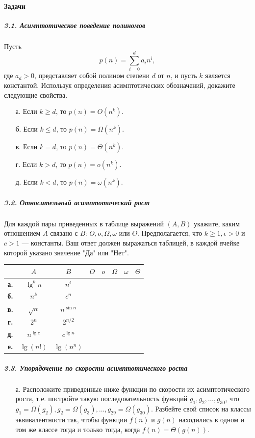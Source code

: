 \paragraph{Задачи}
\subparagraph{3.1. Асимптотическое поведение полиномов}
Пусть 
\[ p(n) = \sum_{i=0}^{d} a_i n^i, \]
где $a_d > 0$, представляет собой полином степени $d$ от $n$, и пусть $k$ является константой. Используя определения асимптотических обозначений, докажите следующие свойства.

\begin{itemize}
    \item[а.] Если $k \ge d$, то $p(n) = O(n^k)$.
    \item[б.] Если $k \le d$, то $p(n) = \Omega(n^k)$.
    \item[в.] Если $k = d$, то $p(n) = \Theta(n^k)$.
    \item[г.] Если $k > d$, то $p(n) = o(n^k)$.
    \item[д.] Если $k < d$, то $p(n) = \omega(n^k)$.
\end{itemize}

\subparagraph{3.2. Относительный асимптотический рост}
Для каждой пары приведенных в таблице выражений $(A, B)$ укажите, каким отношением $A$ связано с $B$: $O, o, \Omega, \omega$ или $\Theta$. Предполагается, что $k \ge 1, \epsilon > 0$ и $c > 1$ — константы. Ваш ответ должен выражаться таблицей, в каждой ячейке которой указано значение "Да" или "Нет".

\begin{center}
\renewcommand{\arraystretch}{1.5}
\begin{tabular}{cc|c|c|c|c|c}
\toprule
& $A$ & $B$ & $O$ & $o$ & $\Omega$ & $\omega$ & $\Theta$ \\ \midrule
\textbf{а.} & $\lg^k n$ & $n^\epsilon$ & & & & & \\ \hline
\textbf{б.} & $n^k$ & $c^n$ & & & & & \\ \hline
\textbf{в.} & $\sqrt{n}$ & $n^{\sin n}$ & & & & & \\ \hline
\textbf{г.} & $2^n$ & $2^{n/2}$ & & & & & \\ \hline
\textbf{д.} & $n^{\lg c}$ & $c^{\lg n}$ & & & & & \\ \hline
\textbf{е.} & $\lg(n!)$ & $\lg(n^n)$ & & & & & \\ 
\bottomrule
\end{tabular}
\end{center}

\subparagraph{3.3. Упорядочение по скорости асимптотического роста}
\begin{itemize}
    \item[а.] Расположите приведенные ниже функции по скорости их асимптотического роста, т.е. постройте такую последовательность функций $g_1, g_2, \dots, g_{30}$, что $g_1 = \Omega(g_2), g_2 = \Omega(g_3), \dots, g_{29} = \Omega(g_{30})$. Разбейте свой список на классы эквивалентности так, чтобы функции $f(n)$ и $g(n)$ находились в одном и том же классе тогда и только тогда, когда $f(n) = \Theta(g(n))$.
\end{itemize}

